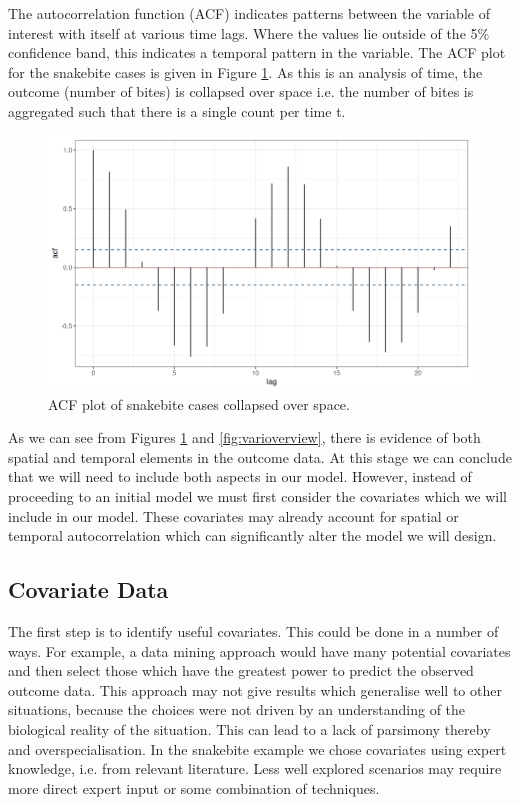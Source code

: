 \documentclass{article}
\begin{document}
The autocorrelation function (ACF) indicates patterns between the variable of interest with itself at various time lags. Where the values lie outside of the 5\% confidence band, this indicates a temporal pattern in the variable. The ACF plot for the snakebite cases is given in Figure \ref{fig:acfoverview}. As this is an analysis of time, the outcome (number of bites) is collapsed over space i.e. the number of bites is aggregated such that there is a single count per time t.

\begin{figure}[h]
    \centering
    \includegraphics[scale=0.5]{images/acfoverview.png}
    \caption{ACF plot of snakebite cases collapsed over space.}
    \label{fig:acfoverview}
\end{figure}

As we can see from Figures \ref{fig:acfoverview} and \ref{fig:varioverview}, there is evidence of both spatial and temporal elements in the outcome data. At this stage we can conclude that we will need to include both aspects in our model. However, instead of proceeding to an initial model we must first consider the covariates which we will include in our model. These covariates may already account for spatial or temporal autocorrelation which can significantly alter the model we will design.

\subsection{Covariate Data}

The first step is to identify useful covariates. This could be done in a number of ways. For example, a data mining approach would have many potential covariates and then select those which have the greatest power to predict the observed outcome data. This approach may not give results which generalise well to other situations, because the choices were not driven by an understanding of the biological reality of the situation. This can lead to a lack of parsimony thereby and overspecialisation. In the snakebite example we chose covariates using expert knowledge, i.e. from relevant literature. Less well explored scenarios may require more direct expert input or some combination of techniques.
\end{document}
